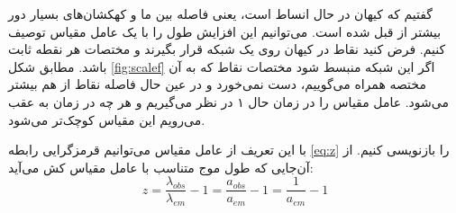 گفتیم که کیهان در حال انساط است، یعنی فاصله بین ما و کهکشان‌های بسیار دور بیشتر از قبل شده است. می‌توانیم این افزایش طول را با یک عامل مقیاس
توصیف کنیم. فرض کنید نقاط در کیهان روی یک شبکه قرار بگیرند و مختصات هر نقطه ثابت باشد. مطابق شکل 
\ref{fig:scalef}
اگر این شبکه منبسط شود مختصات نقاط که به آن مختصه همراه می‌گوییم، دست نمی‌خورد و در عین حال فاصله نقاط از هم بیشتر می‌شود. عامل مقیاس را در زمان حال ۱ در نظر می‌گیریم و هر چه در زمان به عقب می‌رویم این مقیاس کوچک‌تر می‌شود.

با این تعریف از عامل مقیاس می‌توانیم قرمزگرایی رابطه 
\ref{eq:z}
را بازنویسی کنیم. از آن‌جایی که طول موج متناسب با عامل مقیاس کش می‌آید:
\begin{equation}
	z = \frac{\lambda_{obs}}{\lambda_{em}} -1 = \frac{a_{obs}}{a_{em}} -1 = \frac{1}{a_{em}} -1
\end{equation}
\label{eq:z_a}

